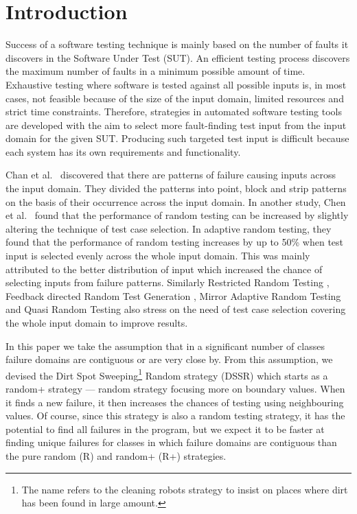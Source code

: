 \documentclass[conference]{IEEEtran}
\begin{document}
\section{Introduction}\label{sec:intro}
Success of a software testing technique is mainly based on the number of faults it discovers in the Software Under Test (SUT). An efficient testing process discovers the maximum number of faults in a minimum possible amount of time. Exhaustive testing where software is tested against all possible inputs is, in most cases, not feasible because of the size of the input domain, limited resources and strict time constraints. Therefore, strategies in automated software testing tools are developed with the aim to select more fault-finding test input from the input domain for the given SUT. Producing such targeted test input is difficult because each system has its own requirements and functionality.

Chan et al.~\cite{Chan1996} discovered that there are patterns of failure causing inputs across the input domain. They divided the patterns into point, block and strip patterns on the basis of their occurrence across the input domain. In another study, Chen et al.~\cite{Chen2008} found that the performance of random testing can be increased by slightly altering the technique of test case selection. In adaptive random testing, they found that the performance of random testing increases by up to 50\% when test input is selected evenly across the whole input domain. This was mainly attributed to the better distribution of input which increased the chance of selecting inputs from failure patterns. Similarly Restricted Random Testing \cite{Chan2002}, Feedback directed Random Test Generation \cite{Pacheco2007a}, Mirror Adaptive Random Testing \cite{Chen2003} and Quasi Random Testing \cite{Chen2005} also stress on the need of test case selection covering the whole input domain to improve results.

In this paper we take the assumption that in a significant number of classes failure domains are contiguous or are very close by. From this assumption, we devised the Dirt Spot Sweeping\footnote{The name refers to the cleaning robots strategy to insist on places where dirt has been found in large amount.} Random strategy (DSSR) which starts as a random+ strategy --- random strategy focusing more on boundary values. When it finds a new failure, it then increases the chances of testing using neighbouring values. Of course, since this strategy is also a random testing strategy, it has the potential to find all failures in the program, but we expect it to be faster at finding unique failures for classes in which failure domains are contiguous than the pure random (R) and random+ (R+) strategies.
\end{document}
